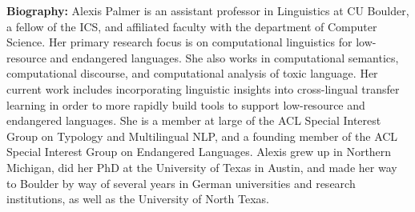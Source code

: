 \vspace{1em}

{\bfseries Biography:}
Alexis Palmer is an assistant professor in Linguistics at CU Boulder, a fellow of the ICS, and affiliated faculty with the department of Computer Science. Her primary research focus is on computational linguistics for low-resource and endangered languages. She also works in computational semantics, computational discourse, and computational analysis of toxic language. Her current work includes incorporating linguistic insights into cross-lingual transfer learning in order to more rapidly build tools to support low-resource and endangered languages. She is a member at large of the ACL Special Interest Group on Typology and Multilingual NLP, and a founding member of the ACL Special Interest Group on Endangered Languages. Alexis grew up in Northern Michigan, did her PhD at the University of Texas in Austin, and made her way to Boulder by way of several years in German universities and research institutions, as well as the University of North Texas.

\newpage
